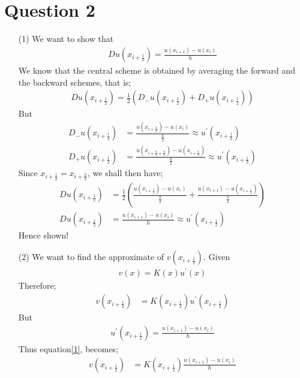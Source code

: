 \documentclass[12pt,a4paper]{article}
\begin{document}
\section*{Question 2}
\begin{itemize}
	\item [(1)]
	We want to show that
	\begin{align*}
	Du(x_{i+\frac{1}{2}})=\frac{u(x_{i+1})-u(x_{i})}{h}
	\end{align*}
	We know that the central scheme is obtained by averaging the forward and the backward schemes, that is;
	\begin{align*}
	Du(x_{i+\frac{1}{2}})=\frac{1}{2}\left(D_{-}u(x_{i+\frac{1}{2}})+D_{+}u(x_{i+\frac{1}{2}})\right)
	\end{align*}
	But
	\begin{align*}
	D_{-}u(x_{i+\frac{1}{2}})&=\frac{u(x_{i+\frac{h}{2}})-u(x_{i})}{\frac{h}{2}}\approx u^{\prime}(x_{i+\frac{1}{2}})\\
		D_{+}u(x_{i+\frac{1}{2}})&=\frac{u(x_{i+\frac{h}{2}+\frac{h}{2}})-u(x_{i+\frac{h}{2}})}{\frac{h}{2}}\approx u^{\prime}(x_{i+\frac{1}{2}})
	\end{align*}
	Since $x_{i+\frac{1}{2}}=x_{i+\frac{h}{2}}$, we shall then have;
	\begin{align*}
		Du(x_{i+\frac{1}{2}})&=\frac{1}{2}\left(\frac{u(x_{i+\frac{1}{2}})-u(x_{i})}{\frac{h}{2}}+\frac{u(x_{i+1})-u(x_{i+\frac{1}{2}})}{\frac{h}{2}}\right)\\
	Du(x_{i+\frac{1}{2}})&=\frac{u(x_{i+1})-u(x_{i})}{h}\approx u^{\prime}(x_{i+\frac{1}{2}})
	\end{align*}
	Hence shown!
	\item[(2)]
	We want to find the approximate of $v(x_{i+\frac{1}{2}}).$
	Given
	\begin{align*}
	v(x)=K(x)u^{\prime}(x)
	\end{align*}
	Therefore;
	\begin{align}
	v\left(x_{i+\frac{1}{2}}\right)&=K\left(x_{i+\frac{1}{2}}\right)u^{\prime}\left(x_{i+\frac{1}{2}}\right) \label{1}
	\end{align}
	But
	\begin{align*}
	u^{\prime}\left(x_{i+\frac{1}{2}}\right)=\frac{u\left(x_{i+1}\right)-u\left(x_{i}\right)}{h}
	\end{align*}
	Thus equation\ref{1}, becomes;
	\begin{align}
		v\left(x_{i+\frac{1}{2}}\right)&=K\left(x_{i+\frac{1}{2}}\right)\frac{u\left(x_{i+1}\right)-u\left(x_{i}\right)}{h} \label{3}
	\end{align}

\end{itemize}
\end{document}
